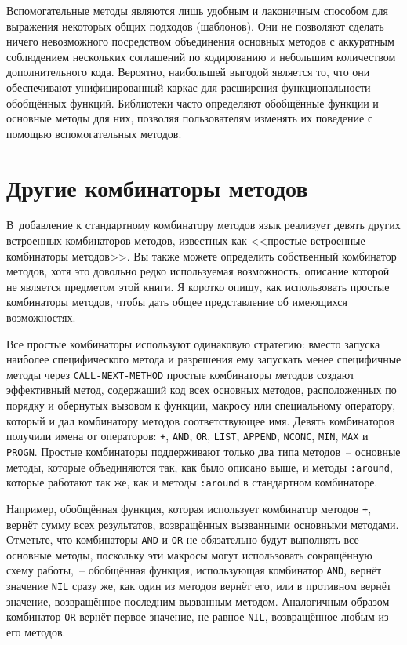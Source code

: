 Вспомогательные методы являются лишь удобным и лаконичным способом для выражения некоторых
общих подходов (шаблонов).  Они не позволяют сделать ничего невозможного посредством
объединения основных методов с аккуратным соблюдением нескольких соглашений по кодированию
и небольшим количеством дополнительного кода. Вероятно, наибольшей выгодой является то,
что они обеспечивают унифицированный каркас для расширения функциональности обобщённых
функций.  Библиотеки часто определяют обобщённые функции и основные методы для них,
позволяя пользователям изменять их поведение с помощью вспомогательных методов.

\section{Другие комбинаторы методов}

В~добавление к стандартному комбинатору методов язык реализует девять других встроенных
комбинаторов методов, известных как <<простые встроенные комбинаторы методов>>.  Вы также
можете определить собственный комбинатор методов, хотя это довольно редко используемая
возможность, описание которой не является предметом этой книги.  Я коротко опишу, как
использовать простые комбинаторы методов, чтобы дать общее представление об имеющихся
возможностях.

Все простые комбинаторы используют одинаковую стратегию: вместо запуска наиболее
специфического метода и разрешения ему запускать менее специфичные методы через
\lstinline{CALL-NEXT-METHOD} простые комбинаторы методов создают эффективный метод, содержащий
код всех основных методов, расположенных по порядку и обернутых вызовом к функции,
макросу или специальному оператору, который и дал комбинатору методов соответствующее имя.
Девять комбинаторов получили имена от операторов: \lstinline{+}, \lstinline{AND}, \lstinline{OR},
\lstinline{LIST}, \lstinline{APPEND}, \lstinline{NCONC}, \lstinline{MIN}, \lstinline{MAX} и \lstinline{PROGN}.  Простые
комбинаторы поддерживают только два типа методов~-- основные методы, которые объединяются
так, как было описано выше, и методы \lstinline{:around}, которые работают так же, как и методы
\lstinline{:around} в стандартном комбинаторе.

Например, обобщённая функция, которая использует комбинатор методов \lstinline{+}, вернёт сумму
всех результатов, возвращённых вызванными основными методами.  Отметьте, что комбинаторы
\lstinline{AND} и \lstinline{OR} не обязательно будут выполнять все основные методы, поскольку эти
макросы могут использовать сокращённую схему работы,~-- обобщённая функция, использующая
комбинатор \lstinline{AND}, вернёт значение \lstinline{NIL} сразу же, как один из методов вернёт его,
или в противном вернёт значение, возвращённое последним вызванным методом.  Аналогичным
образом комбинатор \lstinline{OR} вернёт первое значение, не равное-\lstinline{NIL}, возвращённое
любым из его методов.

